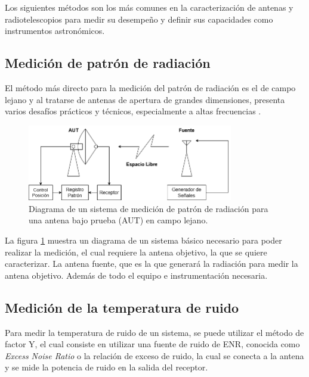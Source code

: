 Los siguientes métodos son los más comunes en la caracterización de antenas y radiotelescopios para medir su desempeño y definir sus capacidades como instrumentos astronómicos.\\

\subsection{Medición de patrón de radiación}

El método más directo para la medición del patrón de radiación es el de campo lejano y al tratarse de antenas de apertura de grandes dimensiones, presenta varios desafíos prácticos y técnicos, especialmente a altas frecuencias \cite{Astudillo2014}.\\

\begin{figure}
    \centering
    \includegraphics[width = 0.8\textwidth]{img/farfielddiag}
    \caption{Diagrama de un sistema de medición de patrón de radiación para una antena bajo prueba (AUT) en campo lejano.}
    \label{fig:farfield}
\end{figure}

La figura \ref{fig:farfield} muestra un diagrama de un sistema básico necesario para poder realizar la medición, el cual requiere la antena objetivo, la que se quiere caracterizar. La antena fuente, que es la que generará la radiación para medir la antena objetivo. Además de todo el equipo e instrumentación necesaria.\\

\subsection{Medición de la temperatura de ruido}

Para medir la temperatura de ruido de un sistema, se puede utilizar el método de factor Y, el cual consiste en utilizar una fuente de ruido de ENR, conocida como \textit{Excess Noise Ratio} o la relación de exceso de ruido, la cual se conecta a la antena y se mide la potencia de ruido en la salida del receptor.\\

